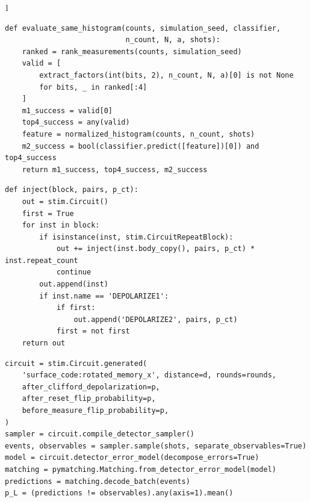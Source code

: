 \par\medskip\noindent
\begin{minipage}{\linewidth}
\begin{spacing}{1}
\lstset{basicstyle=\ttfamily\footnotesize,aboveskip=4pt,belowskip=4pt}
\begin{lstlisting}[caption={Decisione M2 sullo stesso istogramma usato da M1 e TOP-4}, label={lst:loop_di_inferenza_del}]
def evaluate_same_histogram(counts, simulation_seed, classifier,
                            n_count, N, a, shots):
    ranked = rank_measurements(counts, simulation_seed)
    valid = [
        extract_factors(int(bits, 2), n_count, N, a)[0] is not None
        for bits, _ in ranked[:4]
    ]
    m1_success = valid[0]
    top4_success = any(valid)
    feature = normalized_histogram(counts, n_count, shots)
    m2_success = bool(classifier.predict([feature])[0]) and top4_success
    return m1_success, top4_success, m2_success
\end{lstlisting}
\par\smallskip
\begin{lstlisting}[caption={Iniezione ricorsiva del crosstalk nel circuito del surface code.}, label={lst:crosstalk}]
def inject(block, pairs, p_ct):
    out = stim.Circuit()
    first = True
    for inst in block:
        if isinstance(inst, stim.CircuitRepeatBlock):
            out += inject(inst.body_copy(), pairs, p_ct) * inst.repeat_count
            continue
        out.append(inst)
        if inst.name == 'DEPOLARIZE1':
            if first:
                out.append('DEPOLARIZE2', pairs, p_ct)
            first = not first
    return out
\end{lstlisting}
\par\smallskip
\begin{lstlisting}[caption={Stima di $p_L$ con Stim e PyMatching.}, label={lst:stim_pymatching}]
circuit = stim.Circuit.generated(
    'surface_code:rotated_memory_x', distance=d, rounds=rounds,
    after_clifford_depolarization=p,
    after_reset_flip_probability=p,
    before_measure_flip_probability=p,
)
sampler = circuit.compile_detector_sampler()
events, observables = sampler.sample(shots, separate_observables=True)
model = circuit.detector_error_model(decompose_errors=True)
matching = pymatching.Matching.from_detector_error_model(model)
predictions = matching.decode_batch(events)
p_L = (predictions != observables).any(axis=1).mean()
\end{lstlisting}
\end{spacing}
\end{minipage}
